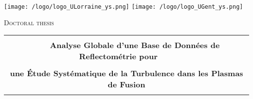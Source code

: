 \begin{titlepage}

\begin{center}
\texttt{[image: /logo/logo\_ULorraine\_ys.png]} \hspace{+1cm}
\texttt{[image: /logo/logo\_UGent\_ys.png]} \\

\vspace{0.3cm}


\vspace{0.3cm}
{\LARGE \textsc{Doctoral thesis\\}}



\vspace{0.3cm}

\begin{tabular}{c}
\noalign{\smallskip} \hline \hline \noalign{\smallskip}\\
{\normalsize \bf {{\normalsize~~~} Analyse Globale d'une Base de Donn\'{e}es de Reflectom\'{e}trie pour {\normalsize~~~}}}\\ \\
{\normalsize \bf {une \'{E}tude Syst\'{e}matique de la Turbulence dans les Plasmas de Fusion }}\\ \\



\end{tabular}
\end{center}
\end{titlepage}

